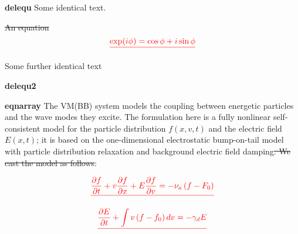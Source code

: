 \documentclass{article}
\providecommand{\DIFdel}[1]{{\protect\color{red}\sout{#1}}}                      %
\providecommand{\DIFaddbegin}{} %
\providecommand{\DIFaddend}{} %
\providecommand{\DIFdelbegin}{} %
\providecommand{\DIFdelend}{} %
\begin{document}
\textbf{delequ}
Some identical text.

\DIFdelbegin \DIFdel{An equation
}\begin{displaymath}
\DIFdel{\exp(i\phi)=\cos \phi + i \sin \phi
}\end{displaymath}

\DIFdelend Some further identical text



\textbf{delequ2}
\DIFdelbegin %
\DIFdelend \DIFaddbegin 
\DIFaddend 

\textbf{eqnarray}
The VM(BB) system models the coupling between energetic particles and the wave modes they excite.
The formulation here is a fully nonlinear self-consistent model for the particle distribution $f(x,v,t)$ and the electric field $E(x,t)$; it is based on the one-dimensional electrostatic bump-on-tail model with particle distribution relaxation and background electric field damping\DIFdelbegin \DIFdel{. We cast the model as follows}\DIFdelend :

\DIFdelbegin \begin{displaymath}
\DIFdel{\label{MVE}
	\frac{\partial f}{\partial t} + v \frac{\partial f}{\partial x} + E \frac{\partial f}{\partial v} =
		- \nu_a \left( f - F_0 \right)
}\end{displaymath}

\begin{displaymath}
\DIFdel{\label{MDCE}
	\frac{\partial E}{\partial t} + \int v \left( f - f_0 \right) dv = - \gamma_d E
}\end{displaymath}
\end{document}
